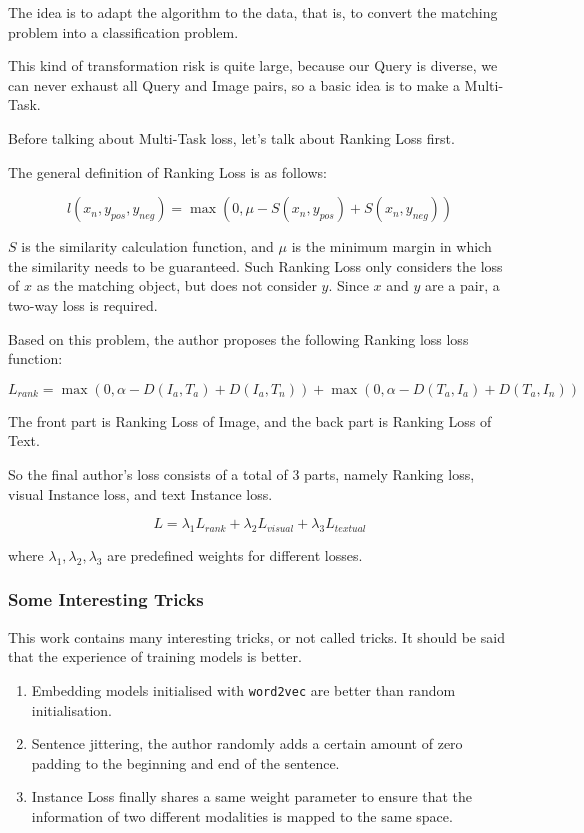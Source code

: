 The idea is to adapt the algorithm to the data, that is, to convert the matching problem into a classification problem.

This kind of transformation risk is quite large, because our Query is diverse, we can never exhaust all Query and Image pairs, so a basic idea is to make a Multi-Task.

Before talking about Multi-Task loss, let's talk about Ranking Loss first.

The general definition of Ranking Loss is as follows:

$$
l\left(x_{n}, y_{p o s}, y_{n e g}\right)=\max \left(0, \mu-S\left(x_{n}, y_{p o s}\right)+S\left(x_{n}, y_{n e g}\right)\right)
$$

$S$ is the similarity calculation function, and $\mu$ is the minimum margin in which the similarity needs to be guaranteed. Such Ranking Loss only considers the loss of $x$ as the matching object, but does not consider $y$. Since $x$ and $y$ are a pair, a two-way loss is required.

Based on this problem, the author proposes the following Ranking loss loss function:

$$
L_{r a n k}=\max \left(0, \alpha-D\left(I_{a}, T_{a}\right)+D\left(I_{a}, T_{n}\right)\right)+\max \left(0, \alpha-D\left(T_{a}, I_{a}\right)+D\left(T_{a}, I_{n}\right)\right)
$$

The front part is Ranking Loss of Image, and the back part is Ranking Loss of Text.

So the final author's loss consists of a total of 3 parts, namely Ranking loss, visual Instance loss, and text Instance loss.

$$
L=\lambda_{1} L_{r a n k}+\lambda_{2} L_{v i s u a l}+\lambda_{3} L_{t e x t u a l}
$$

where $\lambda_{1}, \lambda_{2}, \lambda_{3}$ are predefined weights for different losses.

\subsubsection{Some Interesting Tricks}
This work contains many interesting tricks, or not called tricks. It should be said that the experience of training models is better.

\begin{enumerate}
    \item Embedding models initialised with \verb|word2vec| are better than random initialisation.
    \item Sentence jittering, the author randomly adds a certain amount of zero padding to the beginning and end of the sentence.
    \item Instance Loss finally shares a same weight parameter to ensure that the information of two different modalities is mapped to the same space.
\end{enumerate}

